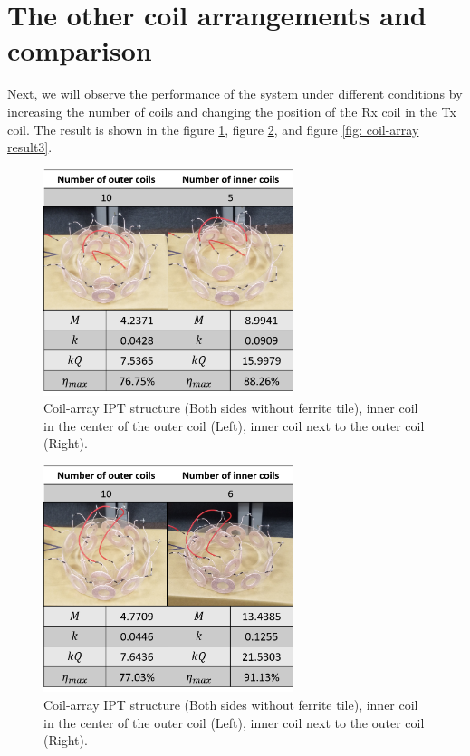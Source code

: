 \section{The other coil arrangements and comparison}
Next, we will observe the performance of the system under different conditions by increasing the number of coils and changing the position of the Rx coil in the Tx coil. The result is shown in the figure \ref{fig: coil-array result1}, figure \ref{fig: coil-array result2}, and figure \ref{fig: coil-array result3}.
\begin{figure}[!b]
    \centering
    \includegraphics[width=0.65\textwidth]{images/4_coil_5_10_without_ferrite.png}
    \caption{Coil-array IPT structure (Both sides without ferrite tile), inner coil in the center of the outer coil (Left), inner coil next to the outer coil (Right).}
    \label{fig: coil-array result1}
\end{figure}
\begin{figure}[!t]
    \centering
    \includegraphics[width=0.65\textwidth]{images/4_coil_6_10_without_ferrite.png}
    \caption{Coil-array IPT structure (Both sides without ferrite tile), inner coil in the center of the outer coil (Left), inner coil next to the outer coil (Right).}
    \label{fig: coil-array result2}
\end{figure}
